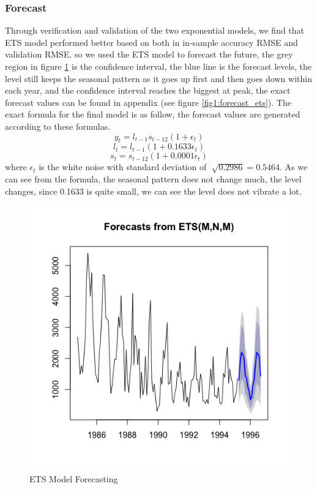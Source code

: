 \documentclass[journal, a4paper]{IEEEtran}
\begin{document}
\subsubsection{Forecast}
Through verification and validation of the two exponential models, we find that ETS model performed better based on both in in-sample accuracy RMSE and validation RMSE. so we used the ETS model to forecast the future, the grey region in figure \ref{fig1:ets_forecast} is the confidence interval, the blue line is the forecast levels, the level still keeps the seasonal pattern as it goes up first and then goes down within each year, and the confidence interval reaches the biggest at peak, the exact forecast values can be found in appendix (see figure \ref{fig1:forecast_ets}). 
The exact formula for the final model is as follow, the forecast values are generated according to these formulas.
$$y_{t}=l_{t-1}s_{t-12}(1+\epsilon_{t})$$
$$l_{t}=l_{t-1}(1+0.1633\epsilon_{t})$$
$$s_{t}=s_{t-12}(1+0.0001\epsilon_{t})$$
where $\epsilon_{t}$ is the white noise with standard deviation of $\sqrt[]{0.2986}=0.5464$. As we can see from the formula, the seasonal pattern does not change much, the level changes, since 0.1633 is quite small, we can see the level does not vibrate a lot.
\begin{figure}[H]
\begin{center}
\includegraphics[scale=0.3]{fig1/ets_forecast.png}
\caption{ETS Model Forecasting}
\label{fig1:ets_forecast}
\end{center}
\end{figure}
\end{document}
